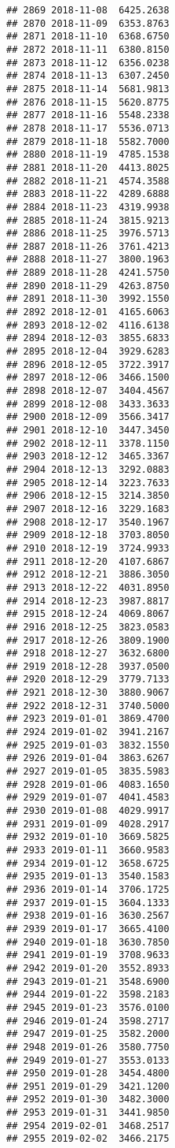 \documentclass[
]{article}
\begin{document}
\begin{verbatim}
## 2869 2018-11-08  6425.2638
## 2870 2018-11-09  6353.8763
## 2871 2018-11-10  6368.6750
## 2872 2018-11-11  6380.8150
## 2873 2018-11-12  6356.0238
## 2874 2018-11-13  6307.2450
## 2875 2018-11-14  5681.9813
## 2876 2018-11-15  5620.8775
## 2877 2018-11-16  5548.2338
## 2878 2018-11-17  5536.0713
## 2879 2018-11-18  5582.7000
## 2880 2018-11-19  4785.1538
## 2881 2018-11-20  4413.8025
## 2882 2018-11-21  4574.3588
## 2883 2018-11-22  4289.6888
## 2884 2018-11-23  4319.9938
## 2885 2018-11-24  3815.9213
## 2886 2018-11-25  3976.5713
## 2887 2018-11-26  3761.4213
## 2888 2018-11-27  3800.1963
## 2889 2018-11-28  4241.5750
## 2890 2018-11-29  4263.8750
## 2891 2018-11-30  3992.1550
## 2892 2018-12-01  4165.6063
## 2893 2018-12-02  4116.6138
## 2894 2018-12-03  3855.6833
## 2895 2018-12-04  3929.6283
## 2896 2018-12-05  3722.3917
## 2897 2018-12-06  3466.1500
## 2898 2018-12-07  3404.4567
## 2899 2018-12-08  3433.3633
## 2900 2018-12-09  3566.3417
## 2901 2018-12-10  3447.3450
## 2902 2018-12-11  3378.1150
## 2903 2018-12-12  3465.3367
## 2904 2018-12-13  3292.0883
## 2905 2018-12-14  3223.7633
## 2906 2018-12-15  3214.3850
## 2907 2018-12-16  3229.1683
## 2908 2018-12-17  3540.1967
## 2909 2018-12-18  3703.8050
## 2910 2018-12-19  3724.9933
## 2911 2018-12-20  4107.6867
## 2912 2018-12-21  3886.3050
## 2913 2018-12-22  4031.8950
## 2914 2018-12-23  3987.8817
## 2915 2018-12-24  4069.8067
## 2916 2018-12-25  3823.0583
## 2917 2018-12-26  3809.1900
## 2918 2018-12-27  3632.6800
## 2919 2018-12-28  3937.0500
## 2920 2018-12-29  3779.7133
## 2921 2018-12-30  3880.9067
## 2922 2018-12-31  3740.5000
## 2923 2019-01-01  3869.4700
## 2924 2019-01-02  3941.2167
## 2925 2019-01-03  3832.1550
## 2926 2019-01-04  3863.6267
## 2927 2019-01-05  3835.5983
## 2928 2019-01-06  4083.1650
## 2929 2019-01-07  4041.4583
## 2930 2019-01-08  4029.9917
## 2931 2019-01-09  4028.2917
## 2932 2019-01-10  3669.5825
## 2933 2019-01-11  3660.9583
## 2934 2019-01-12  3658.6725
## 2935 2019-01-13  3540.1583
## 2936 2019-01-14  3706.1725
## 2937 2019-01-15  3604.1333
## 2938 2019-01-16  3630.2567
## 2939 2019-01-17  3665.4100
## 2940 2019-01-18  3630.7850
## 2941 2019-01-19  3708.9633
## 2942 2019-01-20  3552.8933
## 2943 2019-01-21  3548.6900
## 2944 2019-01-22  3598.2183
## 2945 2019-01-23  3576.0100
## 2946 2019-01-24  3598.2717
## 2947 2019-01-25  3582.2000
## 2948 2019-01-26  3580.7750
## 2949 2019-01-27  3553.0133
## 2950 2019-01-28  3454.4800
## 2951 2019-01-29  3421.1200
## 2952 2019-01-30  3482.3000
## 2953 2019-01-31  3441.9850
## 2954 2019-02-01  3468.2517
## 2955 2019-02-02  3466.2175

\end{verbatim}
\end{document}
